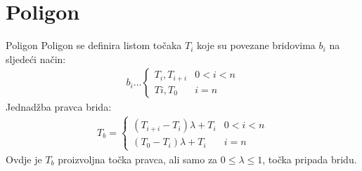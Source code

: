 \documentclass[9pt]{beamer}
\begin{document}
\section{Poligon}
\begin{frame}{Poligon}
	Poligon se definira listom točaka $T_i$ koje su povezane bridovima $b_i$ na sljedeći način:
	\begin{align*}
	b_i \ldots \left\{ \begin{array}{cc}
	T_i, T_{i+i} & 0 < i < n \\
	Ti, T_0 & i = n
	\end{array}\right.
	\end{align*}
	Jednadžba pravca brida:
	\begin{align*}
	T_b= \left\{ \begin{array}{cc}
	(T_{i+i}-T_i)\lambda + T_i & 0 < i < n \\
	(T_0-T_i)\lambda + T_i & i = n
	\end{array}\right.
	\end{align*}
	Ovdje je $T_b$ proizvoljna točka pravca, ali samo za  $0 \leq \lambda \leq 1$, točka pripada bridu.
\end{frame}
\end{document}
